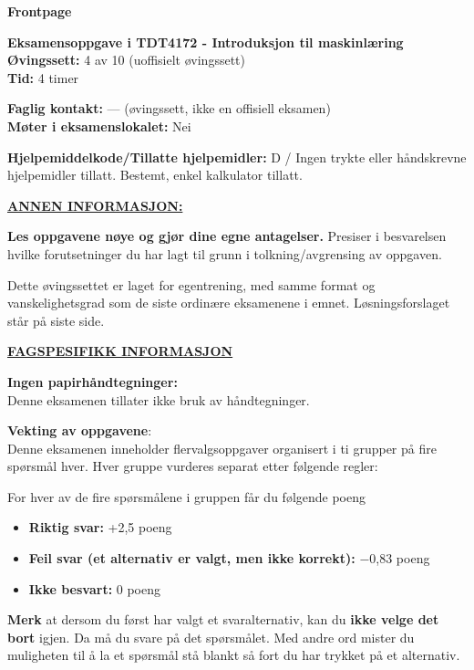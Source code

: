 \documentclass[11pt,a4paper]{article}
\begin{document}
\noindent\hspace*{-1.55em}%
{\sffamily\bfseries\fontsize{18}{22}\selectfont Frontpage}\par\vspace{1.1em}

{\bfseries Eksamensoppgave i TDT4172 - Introduksjon til maskinlæring}\\
{\bfseries Øvingssett:} 4 av 10 (uoffisielt øvingssett)\\
{\bfseries Tid:} 4 timer

\vspace{0.6em}
{\bfseries Faglig kontakt:} --- (øvingssett, ikke en offisiell eksamen)\\
{\bfseries Møter i eksamenslokalet:} Nei

\vspace{0.6em}
{\bfseries Hjelpemiddelkode/Tillatte hjelpemidler:} D / Ingen trykte eller håndskrevne hjelpemidler tillatt.
Bestemt, enkel kalkulator tillatt.

\vspace{0.6em}
{\bfseries\underline{ANNEN INFORMASJON:}}

\vspace{0.4em}
{\bfseries Les oppgavene nøye og gjør dine egne antagelser.} Presiser i besvarelsen hvilke forutsetninger du
har lagt til grunn i tolkning/avgrensing av oppgaven.

Dette øvingssettet er laget for egentrening, med samme format og vanskelighetsgrad som de
siste ordinære eksamenene i emnet. Løsningsforslaget står på siste side.

\vspace{1.6em}
{\bfseries\underline{FAGSPESIFIKK INFORMASJON}}

\vspace{0.4em}
{\bfseries Ingen papirhåndtegninger:}\\
Denne eksamenen tillater ikke bruk av håndtegninger.

\vspace{1.4em}
{\bfseries Vekting av oppgavene}:\\
Denne eksamenen inneholder flervalgsoppgaver organisert i ti grupper på fire spørsmål hver. Hver
gruppe vurderes separat etter følgende regler:

\vspace{0.6em}
For hver av de fire spørsmålene i gruppen får du følgende poeng
\begin{itemize}[leftmargin=2.2em,label=\textperiodcentered,itemsep=0pt]
\item {\bfseries Riktig svar:} +2,5 poeng
\item {\bfseries Feil svar (et alternativ er valgt, men ikke korrekt):} $-$0,83 poeng
\item {\bfseries Ikke besvart:} 0 poeng
\end{itemize}
{\bfseries Merk} at dersom du først har valgt et svaralternativ, kan du {\bfseries ikke velge det bort} igjen. Da må du
svare på det spørsmålet. Med andre ord mister du muligheten til å la et spørsmål stå blankt så fort
du har trykket på et alternativ.
\end{document}
